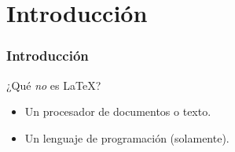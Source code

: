\section{Introducción}\label{sec:Introducción}

\begin{frame}
    \frametitle{Introducción}
    \begin{tcolorbox}[colframe=color1]
        \begin{center}
        ¿Qué \textit{no} es \LaTeX ?
        \end{center}
    \end{tcolorbox}
    \begin{itemize}
        \item Un procesador de documentos o texto.
        \item Un lenguaje de programación (solamente).
    \end{itemize}        
\end{frame}

